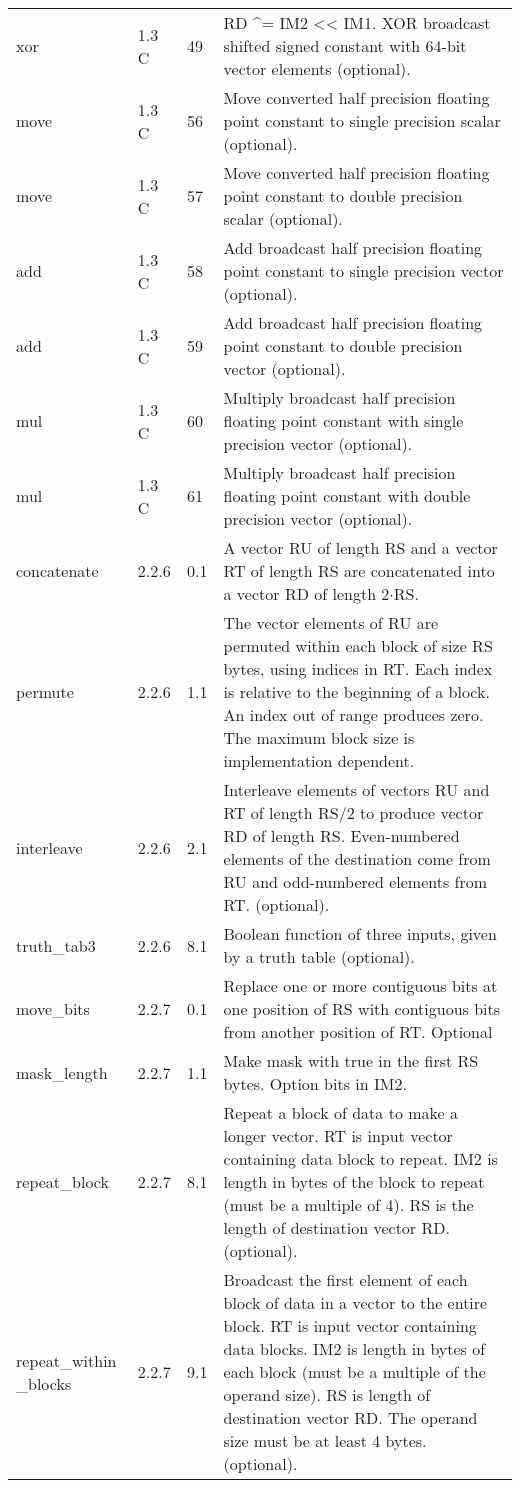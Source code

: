 \documentclass[forwardcom.tex]{subfiles}
\begin{document}
\begin{longtable} {|p{20mm}|p{10mm}|p{8mm}|p{75mm}|}
xor           & 1.3 C & 49 & RD \^{}= IM2 \textless\textless{} IM1. XOR broadcast shifted signed constant with 64-bit vector elements (optional). \\
move          & 1.3 C & 56 & Move converted half precision floating point constant to single
precision scalar (optional). \\
move          & 1.3 C & 57 & Move converted half precision floating point constant to double
precision scalar (optional). \\
add           & 1.3 C & 58 & Add broadcast half precision floating point constant to single
precision vector (optional). \\
add           & 1.3 C & 59 & Add broadcast half precision floating point constant to double
precision vector (optional). \\
mul           & 1.3 C & 60 & Multiply broadcast half precision floating point constant with single precision vector (optional). \\
mul           & 1.3 C & 61 & Multiply broadcast half precision floating point constant with double precision vector (optional). \\

concatenate   & 2.2.6 & 0.1 & A vector RU of length RS and a vector RT of length RS are
concatenated into a vector RD of length 2$\cdot$RS. \\
permute       & 2.2.6 & 1.1 & The vector elements of RU are permuted within each block of size RS bytes, using indices in RT. Each index is relative to the
beginning of a block. An index out of range produces zero. The
maximum block size is implementation dependent. \\
interleave    & 2.2.6 & 2.1 & Interleave elements of vectors RU and RT of length RS/2 to produce vector RD of length RS. Even-numbered elements of the destination come from RU and odd-numbered elements from RT. (optional). \\
truth\_tab3   & 2.2.6 & 8.1 & Boolean function of three inputs, given by a truth table (optional). \\

move\_bits    & 2.2.7 & 0.1 & Replace one or more contiguous bits at one position of RS with contiguous bits from another position of RT. Optional \\
mask\_length  & 2.2.7 & 1.1 & Make mask with true in the first RS bytes. Option bits in IM2. \\
repeat\_block  & 2.2.7 & 8.1 & Repeat a block of data to make a longer vector. RT is input vector containing data block to repeat. IM2 is length in bytes of the block to repeat (must be a multiple of 4). RS is the length of destination vector RD. (optional). \\
repeat\_within \_blocks & 2.2.7 & 9.1 & Broadcast the first element of each block of data in a vector to the entire block. RT is input vector containing data blocks. IM2 is length in bytes of each block (must be a multiple of the operand size). RS is length of destination vector RD. The operand size must be at least 4 bytes. (optional). \\


\end{longtable}
\end{document}
